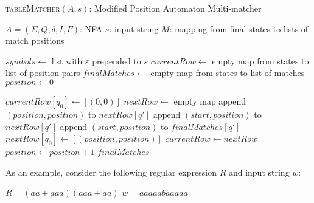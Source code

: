 \begin{algorithm}[H]
\caption{\textsc{tableMatcher}$(A, s)$: Modified Position Automaton Multi-matcher}
\label{alg:table-matcher}
\begin{small}
\begin{algorithmic}[1]
\Require $A = (\Sigma, Q, \delta, I, F)$: NFA
\Require $s$: input string
\Ensure $M$: mapping from final states to lists of match positions

\State $symbols \gets$ list with $\varepsilon$ prepended to $s$
\State $currentRow \gets$ empty map from states to list of position pairs
\State $finalMatches \gets$ empty map from states to list of matches
\State $position \gets 0$

            \State $currentRow[q_0] \gets [(0, 0)]$
        \EndFor
    \Else
        \State $nextRow \gets$ empty map
                                \State append $(position, position)$ to $nextRow[q']$
                            \Else
                                \State append $(start, position)$ to $nextRow[q']$
                                    \State append $(start, position)$ to $finalMatches[q']$
                                \EndIf
                            \EndIf
                        \EndFor
                    \EndFor
                \EndIf
            \EndFor
        \Else
                \State $nextRow[q_0] \gets [(position, position)]$
            \EndFor
        \EndIf
        \State $currentRow \gets nextRow$
        \State $position \gets position + 1$
    \EndIf
\EndFor
\State \Return $finalMatches$
\end{algorithmic}
\end{small}
\end{algorithm}

\clearpage

As an example, consider the following regular expression $R$ and input string $w$:
\begin{center}
	$R = (aa+aaa)(aaa+aa)$ \break
	$w = aaaaabaaaaa$
\end{center}

